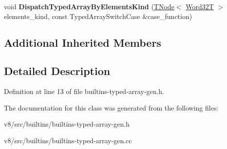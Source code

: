 \begin{DoxyCompactItemize}
\item 
\mbox{\label{classv8_1_1internal_1_1TypedArrayBuiltinsAssembler_a7e526ec0e54d27c3d698a8b5d1dd8706}} 
void {\bfseries Dispatch\+Typed\+Array\+By\+Elements\+Kind} (\mbox{\hyperlink{classv8_1_1internal_1_1compiler_1_1TNode}{T\+Node}}$<$ \mbox{\hyperlink{structv8_1_1internal_1_1Word32T}{Word32T}} $>$ elements\+\_\+kind, const Typed\+Array\+Switch\+Case \&case\+\_\+function)
\end{DoxyCompactItemize}
\subsection*{Additional Inherited Members}


\subsection{Detailed Description}


Definition at line 13 of file builtins-\/typed-\/array-\/gen.\+h.



The documentation for this class was generated from the following files\+:\begin{DoxyCompactItemize}
\item 
v8/src/builtins/builtins-\/typed-\/array-\/gen.\+h\item 
v8/src/builtins/builtins-\/typed-\/array-\/gen.\+cc\end{DoxyCompactItemize}
